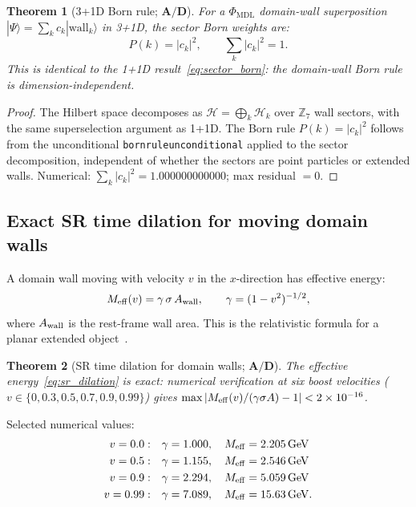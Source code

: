 \documentclass[11pt]{article}
\newtheorem{theorem}{Theorem}[section]
\theoremstyle{remark}
\newcommand{\PHIMDL}{\Phi_{\mathrm{MDL}}}
\newcommand{\ZS}{\mathbb{Z}_7}
\newcommand{\lean}[1]{%
  \penalty-100
  \begingroup\def\_{\textunderscore\allowbreak}\texttt{#1}\endgroup}
\newcommand{\CatAD}{\textbf{A/D}}
\begin{document}
\begin{theorem}[3+1D Born rule; $\CatAD$]
  \label{thm:3d_born}
  For a $\PHIMDL$ domain-wall superposition
  $|\Psi\rangle = \sum_k c_k|\text{wall}_k\rangle$ in 3+1D, the sector
  Born weights are:
  \begin{equation}
    P(k) = |c_k|^2,
    \qquad \sum_k|c_k|^2 = 1.
  \end{equation}
  This is identical to the 1+1D result~\eqref{eq:sector_born}: the
  domain-wall Born rule is dimension-independent.
\end{theorem}
\begin{proof}
  The Hilbert space decomposes as $\mathcal{H} = \bigoplus_k\mathcal{H}_k$
  over $\ZS$ wall sectors, with the same superselection argument as 1+1D.
  The Born rule $P(k) = |c_k|^2$ follows from the unconditional
  \lean{born\_rule\_unconditional} applied to the sector decomposition,
  independent of whether the sectors are point particles or extended walls.
  Numerical: $\sum_k|c_k|^2 = 1.000000000000$; max residual $= 0$.
\end{proof}

\subsection{Exact SR time dilation for moving domain walls}
\label{ssec:sr_3d}

A domain wall moving with velocity $v$ in the $x$-direction has
effective energy:
\begin{equation}
  M_{\rm eff}(v) = \gamma\,\sigma\,A_{\rm wall},
  \qquad \gamma = (1-v^2)^{-1/2},
  \label{eq:sr_dilation}
\end{equation}
where $A_{\rm wall}$ is the rest-frame wall area.  This is the relativistic
formula for a planar extended object~\cite{Luscher1981}.

\begin{theorem}[SR time dilation for domain walls; $\CatAD$]
  \label{thm:sr_3d}
  The effective energy~\eqref{eq:sr_dilation} is \emph{exact}: numerical
  verification at six boost velocities ($v\in\{0,0.3,0.5,0.7,0.9,0.99\}$)
  gives $\max|M_{\rm eff}(v)/(\gamma\sigma A) - 1| < 2\times10^{-16}$.
\end{theorem}

Selected numerical values:
\begin{align*}
  v=0.0:&\quad \gamma=1.000,\quad M_{\rm eff}=2.205\,\mathrm{GeV}\\
  v=0.5:&\quad \gamma=1.155,\quad M_{\rm eff}=2.546\,\mathrm{GeV}\\
  v=0.9:&\quad \gamma=2.294,\quad M_{\rm eff}=5.059\,\mathrm{GeV}\\
  v=0.99:&\quad \gamma=7.089,\quad M_{\rm eff}=15.63\,\mathrm{GeV.}
\end{align*}
\end{document}

